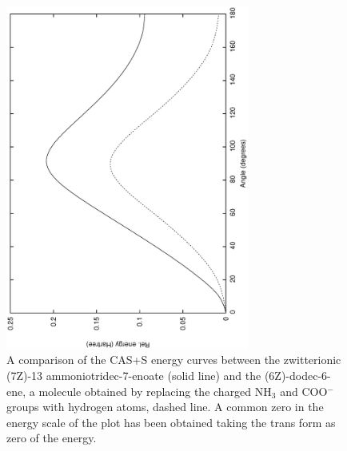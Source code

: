 \begin{figure}[t]
\begin{center}
\includegraphics[width=8cm,angle=270]{02_localization/images/7Z-nocharges.eps}
\caption{\footnotesize A comparison of the CAS+S energy curves between the zwitterionic
(7Z)-13 ammoniotridec-7-enoate (solid line) and the (6Z)-dodec-6-ene, a
molecule obtained by replacing the charged NH$_{3}$ and COO$^{-}$ groups
with hydrogen atoms, dashed line.  A common zero in the energy scale of the
plot has been obtained taking the trans form as zero of the energy.  }
\label{fig:7Z-nocharges}
\end{center}
\end{figure}
